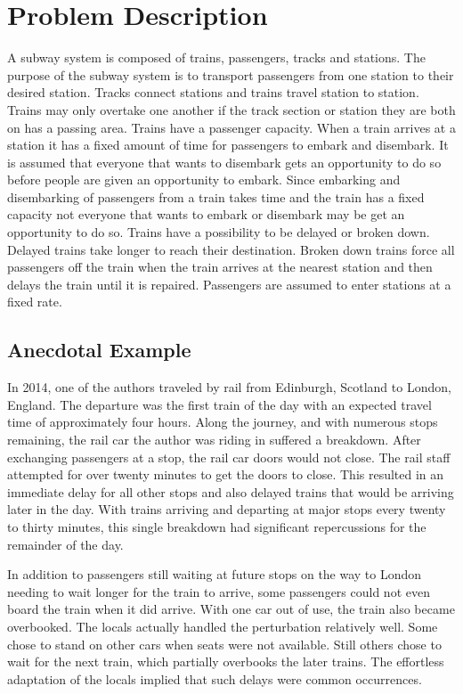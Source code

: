 \section{Problem Description}

A subway system is composed of trains, passengers, tracks and stations. The
purpose of the subway system is to transport passengers from one station to
their desired station. Tracks connect stations and trains travel station to
station. Trains may only overtake one another if the track section or station
they are both on has a passing area. Trains have a passenger capacity. When a
train arrives at a station it has a fixed amount of time for passengers to
embark and disembark. It is assumed that everyone that wants to disembark gets
an opportunity to do so before people are given an opportunity to embark. Since
embarking and disembarking of passengers from a train takes time and the train
has a fixed capacity not everyone that wants to embark or disembark may be get
an opportunity to do so. Trains have a possibility to be delayed or broken down.
Delayed trains take longer to reach their destination. Broken down trains force
all passengers off the train when the train arrives at the nearest station and
then delays the train until it is repaired. Passengers are assumed to enter
stations at a fixed rate.

\subsection{Anecdotal Example}

In 2014, one of the authors traveled by rail from Edinburgh, Scotland to London,
England.  The departure was the first train of the day with an expected travel
time of approximately four hours. Along the journey, and with numerous stops
remaining, the rail car the author was riding in suffered a breakdown.  After
exchanging passengers at a stop, the rail car doors would not close.  The rail
staff attempted for over twenty minutes to get the doors to close.  This resulted
in an immediate delay for all other stops and also delayed trains that would be
arriving later in the day.  With trains arriving and departing at major stops
every twenty to thirty minutes, this single breakdown had significant
repercussions for the remainder of the day. 

In addition to passengers still waiting at future stops on the way to London
needing to wait longer for the train to arrive, some passengers could not even
board the train when it did arrive.  With one car out of use, the train also
became overbooked.  The locals actually handled the perturbation relatively
well.  Some chose to stand on other cars when seats were not available.  Still
others chose to wait for the next train, which partially overbooks the later
trains.  The effortless adaptation of the locals implied that such delays were
common occurrences.

